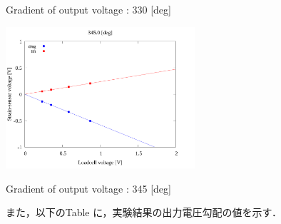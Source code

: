 \begin{multicols}{2}
\begin{figure_here}
\begin{center}
            \caption{Gradient of output voltage : 330 [deg]}
            \includegraphics[width=70mm]{../../02_workspace/result/2-1/plot/04/04_linear_3450.png}
            \caption{Gradient of output voltage : 345 [deg]}
        \end{center}
    \end{figure_here}
\end{multicols}

\newpage

また，以下のTable に，実験結果の出力電圧勾配の値を示す．

